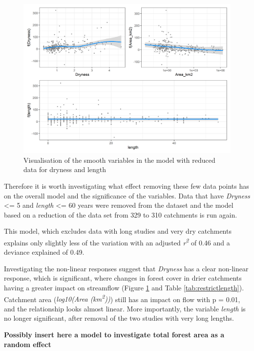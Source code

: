 \documentclass[]{elsarticle} %
\begin{document}
\begin{figure}
\includegraphics[width=0.9\linewidth]{model_redLength_smooths} \caption{Visualisation of the smooth variables in the model with reduced data for dryness and length}\label{fig:smoothsmodelredLength}
\end{figure}

Therefore it is worth investigating what effect removing these few data points has on the overall model and the significance of the variables. Data that have \emph{Dryness} \textless= 5 and \emph{length} \textless= 60 years were removed from the dataset and the model based on a reduction of the data set from 329 to 310 catchments is run again.

This model, which excludes data with long studies and very dry catchments explains only slightly less of the variation with an adjusted \emph{r\textsuperscript{2}} of 0.46 and a deviance explained of 0.49.

Investigating the non-linear responses suggest that \emph{Dryness} has a clear non-linear response, which is significant, where changes in forest cover in drier catchments having a greater impact on streamflow (Figure \ref{fig:smoothsmodelredLength} and Table \ref{tab:restrictlength}). Catchment area (\emph{log10(Area (km\textsuperscript{2}))}) still has an impact on flow with p = 0.01, and the relationship looks almost linear. More importantly, the variable \emph{length} is no longer significant, after removal of the two studies with very long lengths.

\textbf{Possibly insert here a model to investigate total forest area as a random effect}
\end{document}
